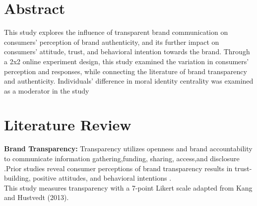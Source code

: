 \documentclass[a0,portrait]{a0poster}
\begin{document}
\begin{minipage}[c]{\linewidth}
\begin{framed}
\begin{multicols}{2}
\section*{Abstract}
\color{Black}
This study explores the influence of transparent brand communication on consumers' perception of brand authenticity, and its further impact on consumers' attitude, trust, and behavioral intention towards the brand. Through a 2x2 online experiment design, this study examined the variation in consumers' perception and responses, while connecting the literature of brand transparency and authenticity. Individuals' difference in moral identity centrality was examined as a moderator in the study\\

\color{Maroon}
\section*{Literature Review}
\color{Black}

  \color{Maroon} \textbf{Brand Transparency:} \color{Black}
Transparency utilizes openness \autocite{parris_exploring_2016}and brand accountability\autocite{yoo_brand_2014} to communicate information gathering,funding, sharing, access,and disclosure \autocite{phillips_online_2009}\autocite{wojdynski_measuring_2018} \autocite{yoo_brand_2014}\autocite{brandao_impact_2018}.Prior studies reveal consumer perceptions of brand transparency results in trust-building, positive attitudes, and behavioral intentions \autocite{reynolds_moral_2008}.\\
This study measures transparency with a 7-point Likert scale adapted from Kang and Hustvedt (2013)\autocite{kang_building_2013}.
\\


\end{multicols}
\end{framed}
\end{minipage}
\end{document}
